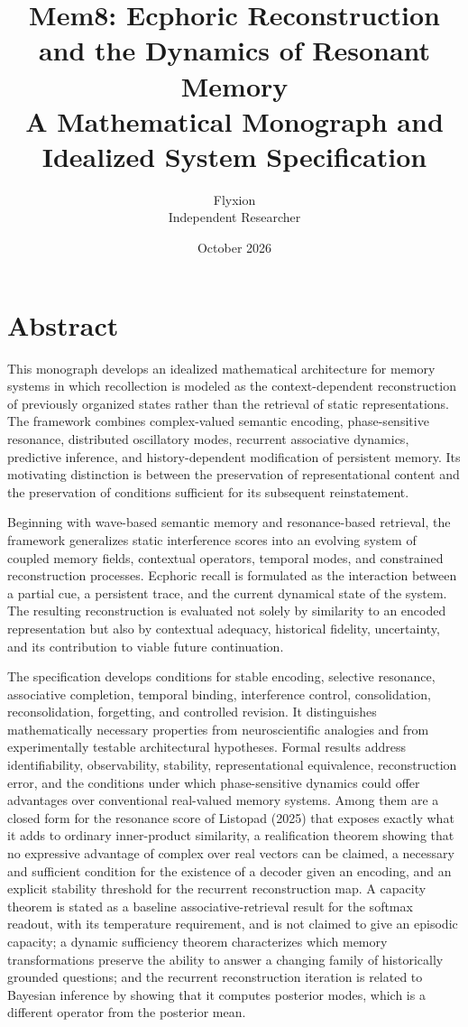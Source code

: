 \documentclass[11pt,twoside,openany]{book}
\title{\textbf{Mem8: Ecphoric Reconstruction\\and the Dynamics of Resonant Memory}\\[1.2ex]
\large A Mathematical Monograph and Idealized System Specification}
\author{Flyxion\\Independent Researcher}
\date{October 2026}
\theoremstyle{plain}
\theoremstyle{definition}
\theoremstyle{remark}
\theoremstyle{definition}
\begin{document}
\frontmatter
\maketitle

\chapter*{Abstract}

This monograph develops an idealized mathematical architecture for memory systems in which recollection is modeled as the context-dependent reconstruction of previously organized states rather than the retrieval of static representations. The framework combines complex-valued semantic encoding, phase-sensitive resonance, distributed oscillatory modes, recurrent associative dynamics, predictive inference, and history-dependent modification of persistent memory. Its motivating distinction is between the preservation of representational content and the preservation of conditions sufficient for its subsequent reinstatement.

Beginning with wave-based semantic memory and resonance-based retrieval, the framework generalizes static interference scores into an evolving system of coupled memory fields, contextual operators, temporal modes, and constrained reconstruction processes. Ecphoric recall is formulated as the interaction between a partial cue, a persistent trace, and the current dynamical state of the system. The resulting reconstruction is evaluated not solely by similarity to an encoded representation but also by contextual adequacy, historical fidelity, uncertainty, and its contribution to viable future continuation.

The specification develops conditions for stable encoding, selective resonance, associative completion, temporal binding, interference control, consolidation, reconsolidation, forgetting, and controlled revision. It distinguishes mathematically necessary properties from neuroscientific analogies and from experimentally testable architectural hypotheses. Formal results address identifiability, observability, stability, representational equivalence, reconstruction error, and the conditions under which phase-sensitive dynamics could offer advantages over conventional real-valued memory systems. Among them are a closed form for the resonance score of Listopad (2025) that exposes exactly what it adds to ordinary inner-product similarity, a realification theorem showing that no expressive advantage of complex over real vectors can be claimed, a necessary and sufficient condition for the existence of a decoder given an encoding, and an explicit stability threshold for the recurrent reconstruction map. A capacity theorem is stated as a baseline associative-retrieval result for the softmax readout, with its temperature requirement, and is not claimed to give an episodic capacity; a dynamic sufficiency theorem characterizes which memory transformations preserve the ability to answer a changing family of historically grounded questions; and the recurrent reconstruction iteration is related to Bayesian inference by showing that it computes posterior modes, which is a different operator from the posterior mean.
\end{document}
